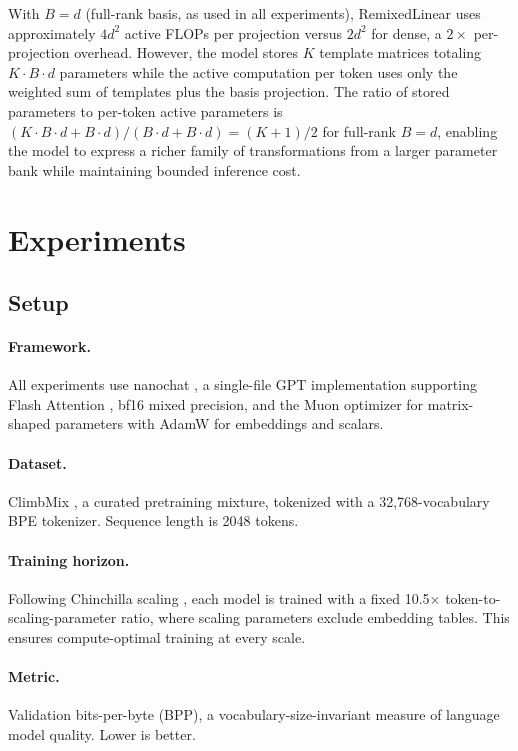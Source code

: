 \documentclass{article}
\begin{document}
With $B = d$ (full-rank basis, as used in all experiments), RemixedLinear uses approximately $4d^2$ active FLOPs per projection versus $2d^2$ for dense, a $2\times$ per-projection overhead. However, the model stores $K$ template matrices totaling $K \cdot B \cdot d$ parameters while the active computation per token uses only the weighted sum of templates plus the basis projection. The ratio of stored parameters to per-token active parameters is $(K \cdot B \cdot d + B \cdot d) / (B \cdot d + B \cdot d) = (K{+}1)/2$ for full-rank $B{=}d$, enabling the model to express a richer family of transformations from a larger parameter bank while maintaining bounded inference cost.

\section{Experiments}
\label{sec:experiments}

\subsection{Setup}

\paragraph{Framework.} All experiments use nanochat \citep{karpathy2025nanochat}, a single-file GPT implementation supporting Flash Attention \citep{dao2022flashattention}, bf16 mixed precision, and the Muon optimizer \citep{jordan2024muon} for matrix-shaped parameters with AdamW for embeddings and scalars.

\paragraph{Dataset.} ClimbMix \citep{nvidia2024climbmix}, a curated pretraining mixture, tokenized with a 32,768-vocabulary BPE tokenizer. Sequence length is 2048 tokens.

\paragraph{Training horizon.} Following Chinchilla scaling \citep{hoffmann2022training}, each model is trained with a fixed 10.5$\times$ token-to-scaling-parameter ratio, where scaling parameters exclude embedding tables. This ensures compute-optimal training at every scale.

\paragraph{Metric.} Validation bits-per-byte (BPP), a vocabulary-size-invariant measure of language model quality. Lower is better.
\end{document}
